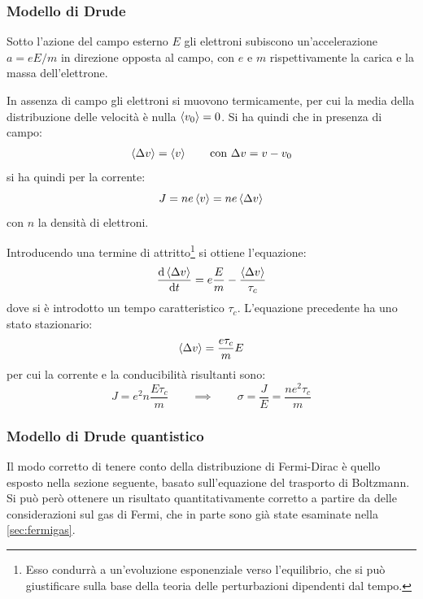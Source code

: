 \subsubsection{Modello di Drude}
Sotto l'azione del campo esterno $ E $ gli elettroni subiscono un'accelerazione $ a = e E /m $ in direzione opposta al campo, con $ e $ e $ m $ rispettivamente la carica e la massa dell'elettrone.

In assenza di campo gli elettroni si muovono termicamente, per cui la media della distribuzione delle velocità è nulla $ \expval{v_0} = 0 $. Si ha quindi che in presenza di campo:
\begin{align*}
\expval{\Delta v} = \expval{v} \qquad \text{con}~ \Delta v = v - v_0
\end{align*}
si ha quindi per la corrente:
\begin{equation*}
J = n e \expval{v} = n e \expval{\Delta v}
\end{equation*}
con $ n $ la densità di elettroni.

Introducendo una termine di attritto\footnote{Esso condurrà a un'evoluzione esponenziale verso l'equilibrio, che si può giustificare sulla base della teoria delle perturbazioni dipendenti dal tempo.} si ottiene l'equazione:
\begin{equation*}
\derivative{\expval{\Delta v}}{t} = e \frac{E}{m} - \frac{\expval{\Delta v}}{\tau_c}
\end{equation*}
dove si è introdotto un tempo caratteristico $ \tau_c $. L'equazione precedente ha uno stato stazionario:
\begin{equation*}
\expval{\Delta v} = \frac{e \tau_c}{m} E
\end{equation*}
per cui la corrente e la conducibilità risultanti sono:
\begin{equation*}
J = e^2 n \frac{E \tau_c}{m} \qquad \implies \qquad \sigma = \frac{J}{E} = \frac{n e^2 \tau_c}{m}
\end{equation*}

\subsubsection{Modello di Drude quantistico}

Il modo corretto di tenere conto della distribuzione di Fermi-Dirac è quello esposto nella sezione seguente, basato sull'equazione del trasporto di Boltzmann. Si può però ottenere un risultato quantitativamente corretto a partire da delle considerazioni sul gas di Fermi, che in parte sono già state esaminate nella \cref{sec:fermigas}.

